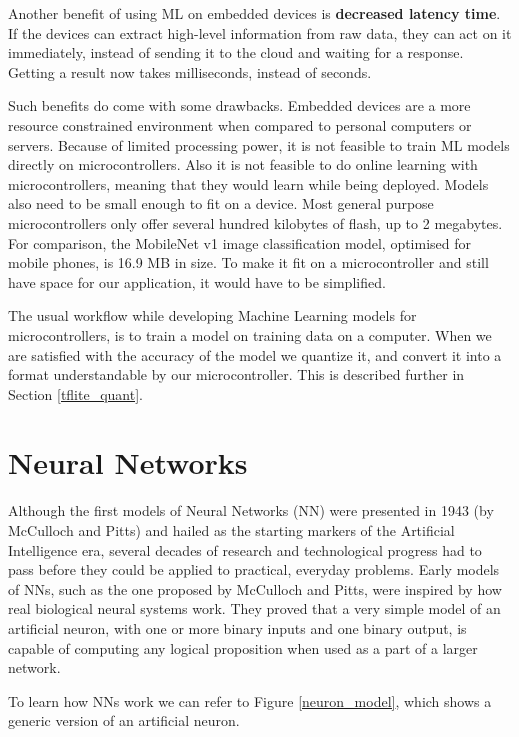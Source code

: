 Another benefit of using ML on embedded devices is \textbf{decreased latency time}.
If the devices can extract high-level information from raw data, they can act on it immediately, instead of sending it to the cloud and waiting for a response. 
Getting a result now takes milliseconds, instead of seconds.

Such benefits do come with some drawbacks.
Embedded devices are a more resource constrained environment when compared to personal computers or servers.
Because of limited processing power, it is not feasible to train ML models directly on microcontrollers.
Also it is not feasible to do online learning with microcontrollers, meaning that they would learn while being deployed.
Models also need to be small enough to fit on a device. 
Most general purpose microcontrollers only offer several hundred kilobytes of flash, up to 2 megabytes.
For comparison, the MobileNet v1 image classification model, optimised for mobile phones, is 16.9 MB in size\cite{daniel_edgeimpulse}.
To make it fit on a microcontroller and still have space for our application, it would have to be simplified.

The usual workflow while developing Machine Learning models for microcontrollers, is to train a model on training data on a computer. 
When we are satisfied with the accuracy of the model we quantize it, and convert it into a format understandable by our microcontroller.
This is  described further in Section \ref{tflite_quant}.


\section{ Neural Networks}\label{neural_networks_section}

Although the first models of Neural Networks (NN) were presented in 1943 (by McCulloch and Pitts)\cite{geron} and hailed as the starting markers of the Artificial Intelligence era, several decades of research and technological progress had to pass before they could be applied to practical, everyday problems.
Early models of NNs, such as the one proposed by McCulloch and Pitts, were inspired by how real biological neural systems work. 
They proved that a very simple model of an artificial neuron, with one or more binary inputs and one binary output, is capable of computing any logical proposition when used as a part of a larger network\cite{geron}.

To learn how NNs work we can refer to Figure \ref{neuron_model}, which shows a generic version of an artificial neuron.

